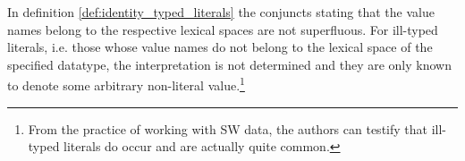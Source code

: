 In definition \ref{def:identity_typed_literals}
  the conjuncts stating that the value names belong to
  the respective lexical spaces are not superfluous.
For ill-typed literals,
  i.e. those whose value names do not belong to the lexical space of
  the specified datatype,
  the interpretation is not determined and they are only known to denote
  some arbitrary non-literal value.\footnote{
    From the practice of working with SW data, the authors can testify
    that ill-typed literals do occur and are actually quite common.}

